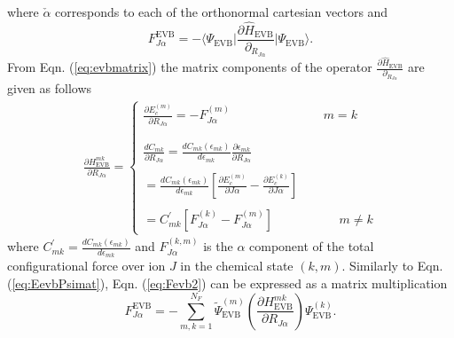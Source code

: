 where $\check{\alpha}$ corresponds to each of the orthonormal cartesian vectors and 
\begin{equation}\label{eq:Fevb2}
F_{J\alpha}^{\text{EVB}}=-\big\langle \Psi_{\text{EVB}}\big| \frac{\partial \hat{H}_{\text{EVB}}}{\partial_{R_{J\alpha}}}\big| \Psi_{\text{EVB}}\big \rangle.
\end{equation}
From Eqn. (\ref{eq:evbmatrix}) the matrix components of the operator 
$\frac{\partial \hat{H}_{\text{EVB}}}{\partial_{R_{J\alpha}}}$ are given as follows
\begin{eqnarray}\label{eq:gradevb}
\frac{\partial H^{mk}_{\text{EVB}}}{\partial R_{J\alpha}}
=\begin{cases}
  \frac{\partial E_{c}^{(m)}}{\partial R_{J\alpha}}=-F^{(m)}_{J\alpha} \,\,\,\,\,\,\,\,\,\,\,\,\,\,\,\,\,\,\,\,\,\,\,\,\,\,\,\,\,\,\,\,\,\,\,\,\,\,\,\,\,\,\,\,\,  m=k  \\
\\
\\
  \frac{d C_{mk}}{\partial R_{J\alpha}}=\frac{d C_{mk}(\epsilon_{mk})}{d\epsilon_{mk}}\frac{\partial \epsilon_{mk}}{\partial R_{J\alpha}}\\
\\
                                                      =\frac{d C_{mk}(\epsilon_{mk})}{d\epsilon_{mk}} \left[\frac{\partial E_{c}^{(m)}}{\partial J\alpha}-\frac{\partial E_{c}^{(k)}}{\partial J\alpha}\right]\\
\\
                                                      =C^{\prime}_{mk}[F^{(k)}_{J\alpha}-F^{(m)}_{J\alpha}] \,\,\,\,\,\,\,\,\,\,\,\,\,\,\,\,\,\,\,\,\,\,\,\,\,\,\,\,\,\,\,\,        m \ne k
\end{cases} 
\end{eqnarray}
where $C^{\prime}_{mk}=\frac{d C_{mk}(\epsilon_{mk})}{d\epsilon_{mk}}$ and  $F^{(k,m)}_{J\alpha}$ is the $\alpha$ component of the total configurational force over ion $J$ in the chemical state $(k,m)$. Similarly to Eqn. (\ref{eq:EevbPsimat}), Eqn. (\ref{eq:Fevb2}) can be expressed as a matrix multiplication
\begin{equation}\label{eq:FevbPsimat}
F_{J\alpha}^{\text{EVB}}=-\sum_{m,k=1}^{N_F} \tilde{\Psi}^{(m)}_{\text{EVB}} \left(\frac{\partial H^{mk}_{\text{EVB}}}{\partial R_{J\alpha}}\right) \Psi^{(k)}_{\text{EVB}}.
\end{equation}	

